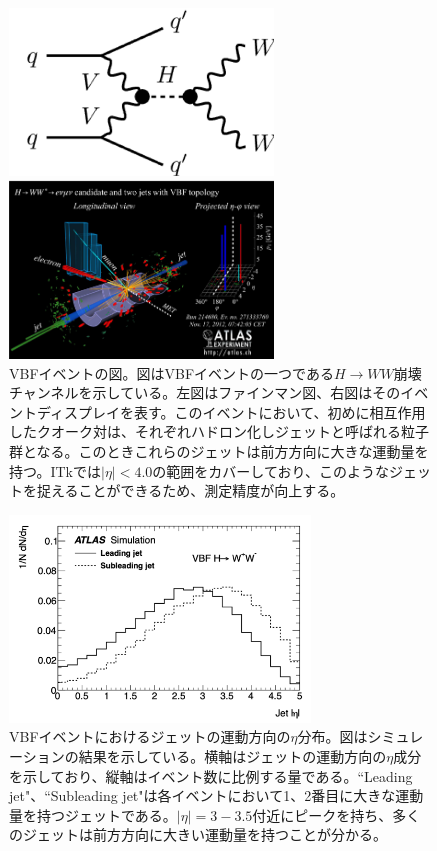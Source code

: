 \begin{figure}[bpt]
  \begin{minipage}{0.5\hsize}
    \begin{center}
    \includegraphics[width=70mm]{./VBF_fainman.png}
    \end{center}
  \end{minipage}
  \begin{minipage}{0.5\hsize}
    \begin{center}
    \includegraphics[width=70mm]{./VBF_event_display.png}
    \end{center}
  \end{minipage}
  \caption[VBFイベントの図]{VBFイベントの図\cite{1-8}。図はVBFイベントの一つである$H\rightarrow WW$崩壊チャンネルを示している。左図はファインマン図、右図はそのイベントディスプレイを表す。このイベントにおいて、初めに相互作用したクオーク対は、それぞれハドロン化しジェットと呼ばれる粒子群となる。このときこれらのジェットは前方方向に大きな運動量を持つ。ITkでは$|\eta|<4.0$の範囲をカバーしており、このようなジェットを捉えることができるため、測定精度が向上する。}
  \label{VBF_image}
\end{figure}

\begin{figure}[bpt]\centering
\includegraphics[width=8cm]{./VBF_jet_eta.png}
\caption[VBFイベントにおけるジェットの運動方向の$\eta$分布]{VBFイベントにおけるジェットの運動方向の$\eta$分布\cite{1-3}。図はシミュレーションの結果を示している。横軸はジェットの運動方向の$\eta$成分を示しており、縦軸はイベント数に比例する量である。``Leading jet"、``Subleading jet"は各イベントにおいて1、2番目に大きな運動量を持つジェットである。$|\eta|=3-3.5$付近にピークを持ち、多くのジェットは前方方向に大きい運動量を持つことが分かる。}
\label{VBF_jet_eta}
\end{figure}


